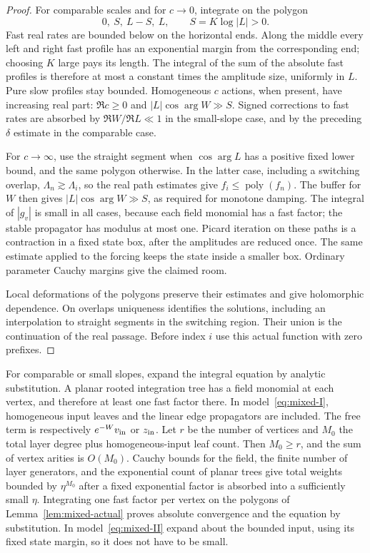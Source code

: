 \begin{proof}
For comparable scales and for $c\to0$, integrate on the polygon
\[
 0,\ S,\ L-S,\ L,\qquad S=K\log|L|>0.
\]
Fast real rates are bounded below on the horizontal ends. Along
the middle every left and right fast profile has an exponential
margin from the corresponding end; choosing $K$ large pays its
length. The integral of the sum of the absolute fast profiles is
therefore at most a constant times the amplitude size, uniformly in
$L$. Pure slow profiles stay bounded. Homogeneous $c$ actions, when
present, have increasing real part: $\Re c\geq0$ and
$|L|\cos\arg W\gg S$. Signed corrections to fast rates are
absorbed by $\Re W/\Re L\ll1$ in the small-slope case, and by the
preceding $\delta$ estimate in the comparable case.

For $c\to\infty$, use the straight segment when $\cos\arg L$
has a positive fixed lower bound, and the same polygon otherwise.
In the latter case, including a switching overlap,
$\Lambda_n\gtrsim\Lambda_i$, so the real path estimates give
$f_i\leq\operatorname{poly}(f_n)$. The buffer for $W$ then gives
$|L|\cos\arg W\gg S$, as required for monotone damping.
The integral of $|g_v|$ is small in all cases, because each field
monomial has a fast factor; the stable propagator has modulus at
most one. Picard iteration on these paths is a contraction in a
fixed state box, after the amplitudes are reduced once. The same
estimate applied to the forcing keeps the state inside a smaller
box. Ordinary parameter Cauchy margins give the claimed room.

Local deformations of the polygons preserve their estimates and
give holomorphic dependence. On overlaps uniqueness identifies the
solutions, including an interpolation to straight segments in the
switching region. Their union is the continuation of the real
passage. Before index $i$ use this actual function with zero
prefixes.
\end{proof}

For comparable or small slopes, expand the integral equation by
analytic substitution. A planar rooted integration tree has a field
monomial at each vertex, and therefore at least one fast factor
there. In model~\eqref{eq:mixed-I}, homogeneous input leaves and the
linear edge propagators are included. The free term is respectively
$e^{-W}v_{\rm in}$ or $z_{\rm in}$. Let $r$ be the number of
vertices and $M_0$ the total layer degree plus homogeneous-input
leaf count. Then $M_0\geq r$, and the sum of vertex arities is
$O(M_0)$. Cauchy bounds for the field, the finite number of layer
generators, and the exponential count of planar trees give total
weights bounded by $\eta^{M_0}$ after a fixed exponential factor is
absorbed into a sufficiently small $\eta$. Integrating one fast
factor per vertex on the polygons of Lemma~\ref{lem:mixed-actual}
proves absolute convergence and the equation by substitution.
In model~\eqref{eq:mixed-II} expand about the bounded input, using
its fixed state margin, so it does not have to be small.

